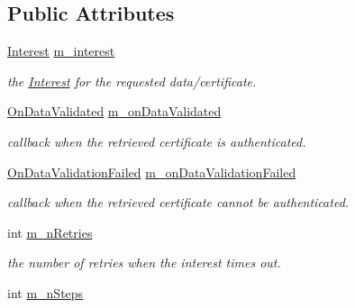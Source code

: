 \subsection*{Public Attributes}
\begin{DoxyCompactItemize}
\item 
\hyperlink{classndn_1_1Interest}{Interest} \hyperlink{classndn_1_1ValidationRequest_a0fcba2434f52141feed6001a1b07cbf0}{m\+\_\+interest}\hypertarget{classndn_1_1ValidationRequest_a0fcba2434f52141feed6001a1b07cbf0}{}\label{classndn_1_1ValidationRequest_a0fcba2434f52141feed6001a1b07cbf0}

\begin{DoxyCompactList}\small\item\em the \hyperlink{classndn_1_1Interest}{Interest} for the requested data/certificate. \end{DoxyCompactList}\item 
\hyperlink{namespacendn_aeaa15e849fd25636f59ca61acb64e532}{On\+Data\+Validated} \hyperlink{classndn_1_1ValidationRequest_acf340041516fb44922a33ef40e5da8c2}{m\+\_\+on\+Data\+Validated}\hypertarget{classndn_1_1ValidationRequest_acf340041516fb44922a33ef40e5da8c2}{}\label{classndn_1_1ValidationRequest_acf340041516fb44922a33ef40e5da8c2}

\begin{DoxyCompactList}\small\item\em callback when the retrieved certificate is authenticated. \end{DoxyCompactList}\item 
\hyperlink{namespacendn_ae3c60219d74ba747e368708d93782760}{On\+Data\+Validation\+Failed} \hyperlink{classndn_1_1ValidationRequest_a2e1d6005915d93e95b49360bad981e08}{m\+\_\+on\+Data\+Validation\+Failed}\hypertarget{classndn_1_1ValidationRequest_a2e1d6005915d93e95b49360bad981e08}{}\label{classndn_1_1ValidationRequest_a2e1d6005915d93e95b49360bad981e08}

\begin{DoxyCompactList}\small\item\em callback when the retrieved certificate cannot be authenticated. \end{DoxyCompactList}\item 
int \hyperlink{classndn_1_1ValidationRequest_a8de876768322a34ae1fc94578980b939}{m\+\_\+n\+Retries}\hypertarget{classndn_1_1ValidationRequest_a8de876768322a34ae1fc94578980b939}{}\label{classndn_1_1ValidationRequest_a8de876768322a34ae1fc94578980b939}

\begin{DoxyCompactList}\small\item\em the number of retries when the interest times out. \end{DoxyCompactList}\item 
int \hyperlink{classndn_1_1ValidationRequest_aca578157c77c579b18e4ac3c86e584a4}{m\+\_\+n\+Steps}\hypertarget{classndn_1_1ValidationRequest_aca578157c77c579b18e4ac3c86e584a4}{}\label{classndn_1_1ValidationRequest_aca578157c77c579b18e4ac3c86e584a4}


\end{DoxyCompactItemize}
